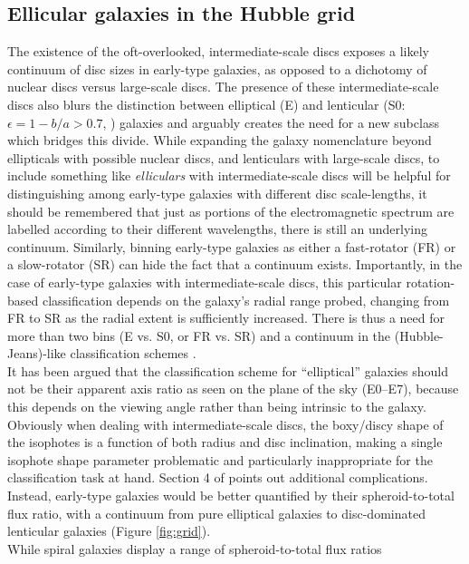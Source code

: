 \documentclass[useAMS,usenatbib,article]{mnras}
\begin{document}
\subsection{Ellicular galaxies in the Hubble grid}
The existence of the oft-overlooked, intermediate-scale discs
exposes a likely continuum of disc sizes in early-type
galaxies, as opposed to a dichotomy of nuclear discs versus large-scale
discs. The presence of these intermediate-scale discs also blurs the
distinction between elliptical (E) and lenticular (S0: $\epsilon = 1-b/a > 0.7$, \citealt{hubble1936,sandage1961}) galaxies and
arguably creates the need for a new subclass which bridges this
divide.  While expanding the galaxy nomenclature beyond ellipticals
with possible nuclear discs, and lenticulars with large-scale discs,
to include something like \emph{elliculars} with intermediate-scale
discs will be helpful for distinguishing among 
early-type galaxies with different disc scale-lengths, it should be
remembered that just as portions of the electromagnetic spectrum are
labelled according to their different wavelengths, there is still an
underlying continuum.  Similarly, binning early-type galaxies as
either a fast-rotator (FR) or a slow-rotator (SR) can hide the fact
that a continuum exists.  Importantly, in the case of early-type
galaxies with intermediate-scale discs, this particular
rotation-based classification depends on the galaxy's radial range probed, 
changing from FR to SR as the radial extent is sufficiently increased. 
There is thus a need for more than two bins (E vs. S0, or FR vs. SR) 
and a continuum in the (Hubble-Jeans)-like classification schemes \citep{vandenbergh1997,sandage2005}. \\
It has been argued that the classification
scheme for ``elliptical'' galaxies should not be their apparent axis ratio
as seen on the plane of the sky (E0--E7), 
because this depends on the viewing angle rather than being intrinsic to the galaxy. 
Obviously when dealing with intermediate-scale discs, the boxy/discy shape of the isophotes is a function of both radius and disc inclination, 
making a single isophote shape parameter problematic and particularly inappropriate for the classification task at hand.
Section 4 of \cite{kormendybender1996} points out additional complications. 
Instead, early-type galaxies would be better quantified by their spheroid-to-total flux ratio, with a
continuum from pure elliptical galaxies to disc-dominated lenticular
galaxies (Figure \ref{fig:grid}).  \\
While spiral galaxies display a range of spheroid-to-total flux ratios
\end{document}
